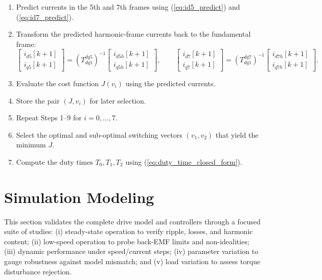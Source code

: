 \begin{enumerate}
  \item Predict currents in the 5th and 7th frames using (\ref{eq:id5_predict}) and (\ref{eq:id7_predict}).

  \item Transform the predicted harmonic-frame currents back to the fundamental frame:
  \[
  \begin{bmatrix} i_{d5}[k+1]\\ i_{q5}[k+1] \end{bmatrix}
  = \left(T_{dq1}^{dq5}\right)^{-1}
    \begin{bmatrix} i_{d5h}[k+1]\\ i_{q5h}[k+1]\end{bmatrix},
  \qquad
  \begin{bmatrix} i_{d7}[k+1]\\ i_{q7}[k+1] \end{bmatrix}
  = \left(T_{dq1}^{dq7}\right)^{-1}
    \begin{bmatrix} i_{d7h}[k+1]\\ i_{q7h}[k+1]\end{bmatrix}.
  \]

  \item Evaluate the cost function $J(v_i)$ using the predicted currents.

  \item Store the pair $(J, v_i)$ for later selection.

  \item Repeat Steps 1–9 for $i=0,\ldots,7$.

  \item Select the optimal and sub-optimal switching vectors $(v_1, v_2)$ that yield the minimum $J$.

  \item Compute the duty times $T_0, T_1, T_2$ using (\ref{eq:duty_time_closed_form}).
\end{enumerate}
\section{Simulation Modeling}
This section validates the complete drive model and controllers through a focused suite of studies: (i) steady-state operation to verify ripple, losses, and harmonic content; (ii) low-speed operation to probe back-EMF limits and non-idealities; (iii)  dynamic performance under speed/current steps; (iv) parameter variation to gauge robustness against model mismatch; and (v) load variation to assess torque disturbance rejection.
